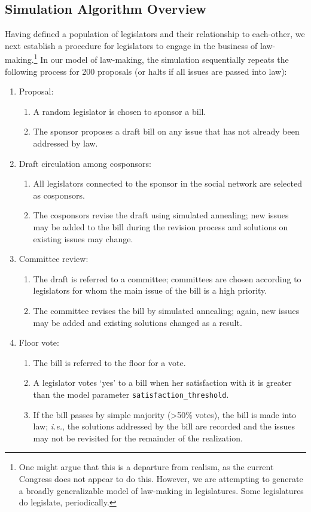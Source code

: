\documentclass[pdftex,12pt]{llncs}
\begin{document}
\subsection{Simulation Algorithm Overview}
Having defined a population of legislators and their relationship to each-other, we next establish a procedure for legislators to engage in the business of law-making.\footnote{One might argue that this is a departure from realism, as the current Congress does not appear to do this. However, we are attempting to generate a broadly generalizable model of law-making in legislatures. Some legislatures do legislate, periodically.} In our model of law-making, the simulation sequentially repeats the following process for 200 proposals (or halts if all issues are passed into law):
\begin{enumerate}
\item Proposal:
\begin{enumerate}
\item A random legislator is chosen to sponsor a bill.
\item The sponsor proposes a draft bill on any issue that has not already been addressed by law.
\end{enumerate}
\item Draft circulation among cosponsors:
\begin{enumerate}
\item All legislators connected to the sponsor in the social network are selected as cosponsors.
\item The cosponsors revise the draft using simulated annealing; new issues may be added to the bill during the revision process and solutions on existing issues may change.
\end{enumerate}
\item Committee review:
\begin{enumerate}
\item The draft is referred to a committee; committees are chosen according to legislators for whom the main issue of the bill is a high priority.
\item The committee revises the bill by simulated annealing; again, new issues may be added and existing solutions changed as a result.
\end{enumerate}
\item Floor vote:
\begin{enumerate}
\item The bill is referred to the floor for a vote.
\item A legislator votes `yes' to a bill when her satisfaction with it is greater than the model parameter \texttt{satisfaction\_threshold}.
\item If the bill passes by simple majority (\textgreater 50\% votes), the bill is made into law; \textit{i.e.}, the solutions addressed by the bill are recorded and the issues may not be revisited for the remainder of the realization.
\end{enumerate}
\end{enumerate}
\end{document}
